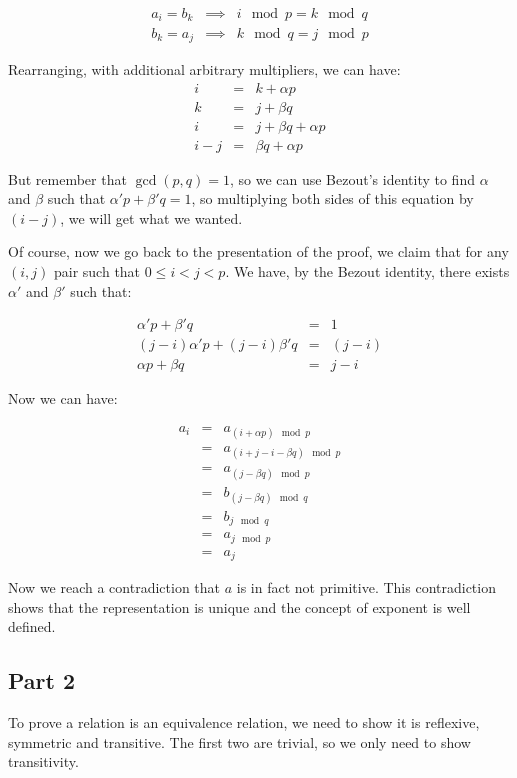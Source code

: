 \documentclass{article}
\begin{document}
\begin{eqnarray*}
  a_i = b_k &\implies& i \mod p = k \mod q \\
  b_k = a_j &\implies& k \mod q = j \mod p
\end{eqnarray*}

Rearranging, with additional arbitrary multipliers, we can have:
\begin{eqnarray*}
  i &=& k + \alpha p \\
  k &=& j + \beta q \\
  i &=& j + \beta q + \alpha p \\
  i - j &=& \beta q + \alpha p
\end{eqnarray*}

But remember that $ \gcd(p, q) = 1 $, so we can use Bezout's identity to find $ \alpha $ and $ \beta $ such that $ \alpha' p + \beta' q = 1 $, so multiplying both sides of this equation by $ (i - j) $, we will get what we wanted.

Of course, now we go back to the presentation of the proof, we claim that for any $ (i, j) $ pair such that  $ 0 \le i < j < p $. We have, by the Bezout identity, there exists $ \alpha' $ and $ \beta' $ such that:

\begin{eqnarray*}
  \alpha' p + \beta' q &=& 1 \\
  (j-i)\alpha' p + (j-i)\beta' q &=& (j-i) \\
  \alpha p + \beta q &=& j-i
\end{eqnarray*}

Now we can have:

\begin{eqnarray*}
  a_i &=& a_{(i + \alpha p) \mod p} \\
      &=& a_{(i + j-i - \beta q) \mod p} \\
      &=& a_{(j - \beta q) \mod p} \\
      &=& b_{(j - \beta q) \mod q} \\
      &=& b_{j \mod q} \\
      &=& a_{j \mod p} \\
      &=& a_j
\end{eqnarray*}

Now we reach a contradiction that $ a $ is in fact not primitive. This contradiction shows that the representation is unique and the concept of exponent is well defined.

\subsection*{Part 2}
To prove a relation is an equivalence relation, we need to show it is reflexive, symmetric and transitive. The first two are trivial, so we only need to show transitivity.
\end{document}
